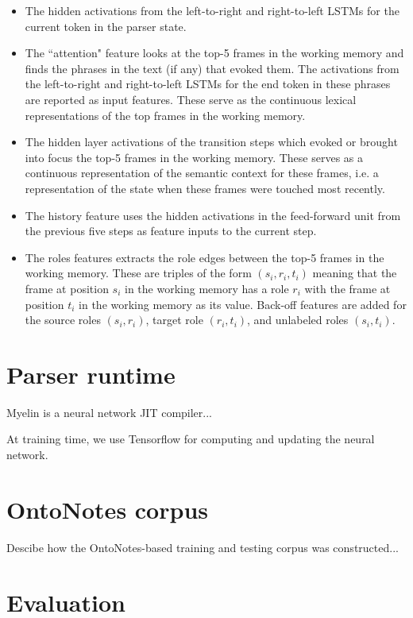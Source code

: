 \documentclass[11pt,a4paper]{article}
\begin{document}
\begin{itemize}
  \item The hidden activations from the left-to-right and right-to-left LSTMs
  for the current token in the parser state.
  \item The ``attention" feature looks at the top-5 frames in the working memory
  and finds the phrases in the text (if any) that evoked them. The activations from the
  left-to-right and right-to-left LSTMs for the end token in these phrases are
  reported as input features. These serve as the continuous lexical representations of the top
  frames in the working memory.
  \item The hidden layer activations of the transition steps which evoked or brought
  into focus the top-5 frames in the working memory. These serves as a continuous
  representation of the semantic context for these frames, i.e. a representation of the
  state when these frames were touched most recently.
  \item The history feature uses the hidden activations in the feed-forward
  unit from the previous five steps as feature inputs to the current step.
  \item The roles features extracts the role edges between the top-5 frames in
  the working memory. These are triples of the form $(s_i, r_i, t_i)$ meaning
  that the frame at position $s_i$ in the working memory has a role $r_i$ with
  the frame at position $t_i$ in the working memory as its value. Back-off
  features are added for the source roles $(s_i,r_i)$, target role $(r_i, t_i)$,
  and unlabeled roles $(s_i,t_i)$.
\end{itemize}

\section{Parser runtime}

Myelin is a neural network JIT compiler...

At training time, we use Tensorflow for computing and updating the neural
network.

\section{OntoNotes corpus}

Descibe how the OntoNotes-based training and testing corpus was constructed...

\section{Evaluation}
\end{document}
